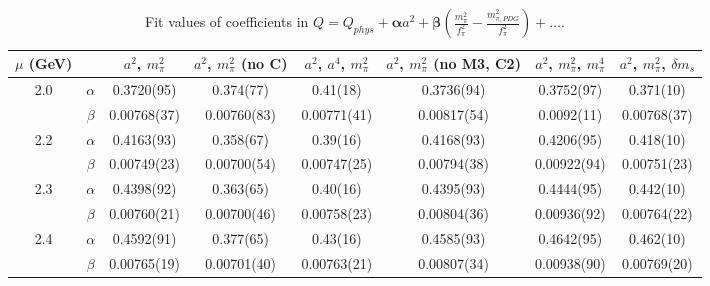 \documentclass[12pt]{extarticle}
\begin{document}
\begin{table}[h!]
\begin{center}
\begin{tabular}{|c c|c|c|c|c|c|c|}
\hline
$\mu$ (GeV) &  & $a^2$, $m_\pi^2$& $a^2$, $m_\pi^2$ (no C)& $a^2$, $a^4$, $m_\pi^2$& $a^2$, $m_\pi^2$ (no M3, C2)& $a^2$, $m_\pi^2$, $m_\pi^4$& $a^2$, $m_\pi^2$, $\delta m_s$\\
\hline
\multirow{2}{0.5in}{2.0} & $\alpha$ & 0.3720(95)& 0.374(77)& 0.41(18)& 0.3736(94)& 0.3752(97)& 0.371(10)\\
 & $\beta$ & 0.00768(37)& 0.00760(83)& 0.00771(41)& 0.00817(54)& 0.0092(11)& 0.00768(37)\\
\hline
\multirow{2}{0.5in}{2.2} & $\alpha$ & 0.4163(93)& 0.358(67)& 0.39(16)& 0.4168(93)& 0.4206(95)& 0.418(10)\\
 & $\beta$ & 0.00749(23)& 0.00700(54)& 0.00747(25)& 0.00794(38)& 0.00922(94)& 0.00751(23)\\
\hline
\multirow{2}{0.5in}{2.3} & $\alpha$ & 0.4398(92)& 0.363(65)& 0.40(16)& 0.4395(93)& 0.4444(95)& 0.442(10)\\
 & $\beta$ & 0.00760(21)& 0.00700(46)& 0.00758(23)& 0.00804(36)& 0.00936(92)& 0.00764(22)\\
\hline
\multirow{2}{0.5in}{2.4} & $\alpha$ & 0.4592(91)& 0.377(65)& 0.43(16)& 0.4585(93)& 0.4642(95)& 0.462(10)\\
 & $\beta$ & 0.00765(19)& 0.00701(40)& 0.00763(21)& 0.00807(34)& 0.00938(90)& 0.00769(20)\\
\hline
\end{tabular}
\caption{Fit values of coefficients in $Q = Q_{phys} + \mathbf{\alpha} a^2 + \mathbf{\beta}\left(\frac{m_\pi^2}{f_\pi^2}-\frac{m_{\pi,PDG}^2}{f_\pi^2}\right) + \ldots$.}
\end{center}
\end{table}
























\clearpage
\end{document}

